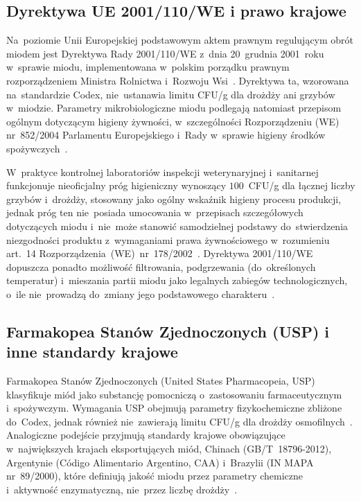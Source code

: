 \subsection{Dyrektywa UE 2001/110/WE i prawo krajowe}

Na~poziomie Unii Europejskiej podstawowym aktem prawnym regulującym obrót miodem jest Dyrektywa Rady 2001/110/WE z~dnia 20~grudnia 2001~roku w~sprawie miodu, implementowana w~polskim porządku prawnym rozporządzeniem
Ministra Rolnictwa i~Rozwoju Wsi~\cite{eudir2001110}. 
Dyrektywa ta, wzorowana na~standardzie Codex, nie~ustanawia limitu CFU/g dla drożdży ani grzybów w~miodzie. Parametry mikrobiologiczne miodu podlegają natomiast przepisom ogólnym dotyczącym higieny żywności, w~szczególności Rozporządzeniu (WE) nr~852/2004 Parlamentu Europejskiego i~Rady
w~sprawie higieny środków spożywczych~\cite{eudir2001110}.

W~praktyce kontrolnej laboratoriów inspekcji weterynaryjnej i~sanitarnej
funkcjonuje nieoficjalny próg higieniczny wynoszący $100$~CFU/g dla
łącznej liczby grzybów i~drożdży, stosowany jako ogólny wskaźnik
higieny procesu produkcji, jednak próg ten nie~posiada umocowania
w~przepisach szczegółowych dotyczących miodu i~nie~może stanowić
samodzielnej podstawy do~stwierdzenia niezgodności produktu
z~wymaganiami prawa żywnościowego w~rozumieniu art.~14
Rozporządzenia~(WE)~nr~178/2002~\cite{eudir2001110}. Dyrektywa
2001/110/WE dopuszcza ponadto możliwość filtrowania, podgrzewania
(do~określonych temperatur) i~mieszania partii miodu jako legalnych
zabiegów technologicznych, o~ile nie~prowadzą do~zmiany jego
podstawowego charakteru~\cite{eudir2001110}.


\subsection{Farmakopea Stanów Zjednoczonych (USP) i inne standardy krajowe}

Farmakopea Stanów Zjednoczonych (United States Pharmacopeia, USP)
klasyfikuje miód jako substancję pomocniczą o~zastosowaniu
farmaceutycznym i~spożywczym. Wymagania USP obejmują parametry
fizykochemiczne zbliżone do~Codex, jednak również nie~zawierają limitu
CFU/g dla drożdży osmofilnych~\cite{tsagkaris2021}. Analogiczne podejście
przyjmują standardy krajowe obowiązujące w~największych krajach
eksportujących miód, Chinach (GB/T~18796-2012), Argentynie
(Código Alimentario Argentino, CAA) i~Brazylii (IN MAPA nr~89/2000), które definiują jakość miodu przez parametry chemiczne i~aktywność enzymatyczną, nie~przez liczbę drożdży~\cite{tsagkaris2021}.

